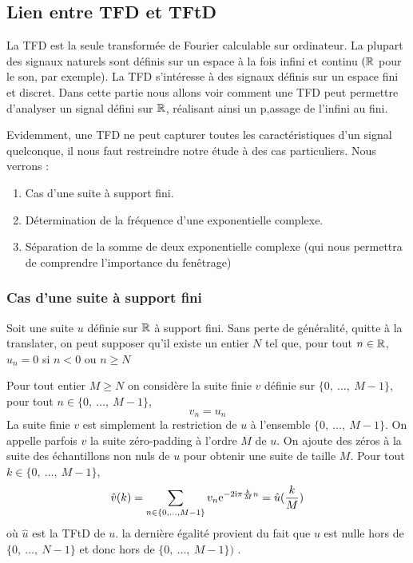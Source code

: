 \begin{definition}
\subsection{Lien entre TFD et TFtD}
La TFD est la seule transform\'{e}e de Fourier calculable sur ordinateur. La plupart des signaux naturels sont d\'{e}finis sur un espace \`{a} la fois infini et continu $(\mathbb{R}$ pour le son, par exemple). La TFD s'int\'{e}resse \`{a} des signaux d\'{e}finis sur un espace fini et discret.  Dans cette partie nous allons voir comment une TFD peut permettre d'analyser un signal d\'{e}fini sur $\mathbb{R}$, r\'{e}alisant ainsi un p,assage de l'infini au fini.

Evidemment, une TFD ne peut capturer toutes les caract\'{e}ristiques d'un signal quelconque, il nous faut restreindre notre \'{e}tude \`{a} des cas particuliers. Nous verrons : 
\begin{enumerate}
\item Cas d'une suite \`{a} support fini.
\item D\'{e}termination de la fr\'{e}quence d'une exponentielle complexe.
\item S\'{e}paration de la somme de deux exponentielle complexe (qui nous permettra de comprendre l'importance du fenêtrage)
\end{enumerate}

\subsubsection{Cas d'une suite \`{a} support fini}
Soit une suite $u$ d\'{e}finie sur $\mathbb{R}$ \`{a} support fini. Sans perte de g\'{e}n\'{e}ralit\'{e}, quitte \`{a} la translater, on peut supposer qu'il existe un entier $N$ tel que, pour tout  $n\in \mathbb{R}$, $u_{n}=0$ si $n<0$ ou $n\geq N$

Pour tout entier $M\geq N$ on consid\`{e}re la suite finie $v$ d\'{e}finie sur $\{0,\ \ldots,\ M-1\}$, pour tout $n\in\{0,\ \ldots,\ M-1\}$,
$$
v_{n}=u_{n}
$$
La suite finie $v$ est simplement la restriction de $u$ \`{a} l'ensemble $\{0,\ \ldots,\ M-1\}$. On appelle parfois $v$ la suite z\'{e}ro-padding \`{a} l'ordre $M$ de $u$. On ajoute des z\'{e}ros \`{a} la suite des \'{e}chantillons non nuls de $u$ pour obtenir une suite de taille $M$. Pour tout $k\in\{0,\ \ldots,\ M-1\}$, 
$$
\hat{v}(k)=\sum_{n\in\{0,\ldots,M-1\}}v_{n}\mathrm{e}^{-2\mathrm{i}\pi \frac{k}{M}n}=\hat{u}(\frac{k}{M})
$$
o\`{u} $\hat{u}$ est la TFtD de $u$. la derni\`{e}re \'{e}galit\'{e} provient du fait que $u$ est nulle hors de $\{0,\ \ldots,\ N-1\}$ et donc hors de $\{0,\ \ldots,\ M-1\})$ .




\end{definition}
